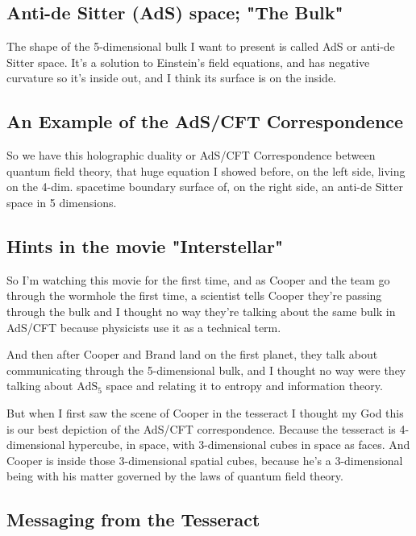\documentclass[10pt]{amsart}
\begin{document}
\subsection{Anti-de Sitter (AdS) space; "The Bulk"}

The shape of the 5-dimensional bulk I want to present is called AdS or anti-de Sitter space. It's a solution to Einstein's field equations, and has negative curvature so it's inside out, and I think its surface is on the inside.

\subsection{An Example of the AdS/CFT Correspondence}

So we have this holographic duality or AdS/CFT Correspondence between quantum field theory, that huge equation I showed before, on the left side, living on the 4-dim. spacetime boundary surface of, on the right side, an anti-de Sitter space in 5 dimensions.

\subsection{Hints in the movie "Interstellar"}

So I'm watching this movie for the first time, and as Cooper and the team go through the wormhole the first time, a scientist tells Cooper they're passing through the bulk and I thought no way they're talking about the same bulk in AdS/CFT because physicists use it as a technical term.

And then after Cooper and Brand land on the first planet, they talk about communicating through the 5-dimensional bulk, and I thought no way were they talking about $\text{AdS}_5$ space and relating it to entropy and information theory.

But when I first saw the scene of Cooper in the tesseract I thought my God this is our best depiction of the AdS/CFT correspondence. Because the tesseract is 4-dimensional hypercube, in space, with 3-dimensional cubes in space as faces. And Cooper is inside those 3-dimensional spatial cubes, because he's a 3-dimensional being with his matter governed by the laws of quantum field theory. 

\subsection{Messaging from the Tesseract}
\end{document}
